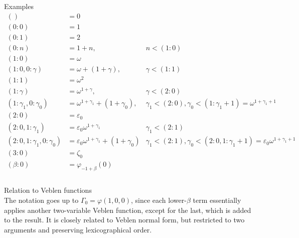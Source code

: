 \documentclass{article}
\newcommand{\w}{\omega}
\newcommand{\e}{\varepsilon}
\begin{document}


Examples \\
\begin{align*}
  () &= 0 \\
  (0: 0) &= 1 \\
  (0: 1) &= 2 \\
  (0: n) &= 1+n, & n < (1: 0) \\
  (1: 0) &= \w \\
  (1: 0, 0: \gamma) &= \w+(1+\gamma), & \gamma < (1: 1) \\
  (1: 1) &= \w^2 \\
  (1: \gamma) &= \w^{1+\gamma}, & \gamma < (2: 0) \\
  (1: \gamma_1, 0: \gamma_0) &= \w^{1+\gamma_1}+(1+\gamma_0),
  & \gamma_1 < (2: 0), \gamma_0 < (1: \gamma_1+1) = \w^{1+\gamma_1+1} \\
  (2: 0) &= \e_0 \\
  (2: 0, 1: \gamma_1) &= \e_0\w^{1+\gamma_1}
  & \gamma_1 < (2: 1) \\
  (2: 0, 1: \gamma_1, 0: \gamma_0) &= \e_0\w^{1+\gamma_1}+(1+\gamma_0)
  & \gamma_1 < (2: 1), \gamma_0 < (2: 0, 1: \gamma_1+1) = \e_0\w^{1+\gamma_1+1} \\
  (3: 0) &= \zeta_0 \\
  (\beta: 0) &= \varphi_{-1+\beta}(0) \\
\end{align*} \\

Relation to Veblen functions \\
The notation goes up to $\Gamma_0=\varphi(1, 0, 0)$,
since each lower-$\beta$ term essentially applies
another two-variable Veblen function,
except for the last, which is added to the result.
It is closely related to Veblen normal form,
but restricted to two arguments
and preserving lexicographical order. \\
\end{document}
